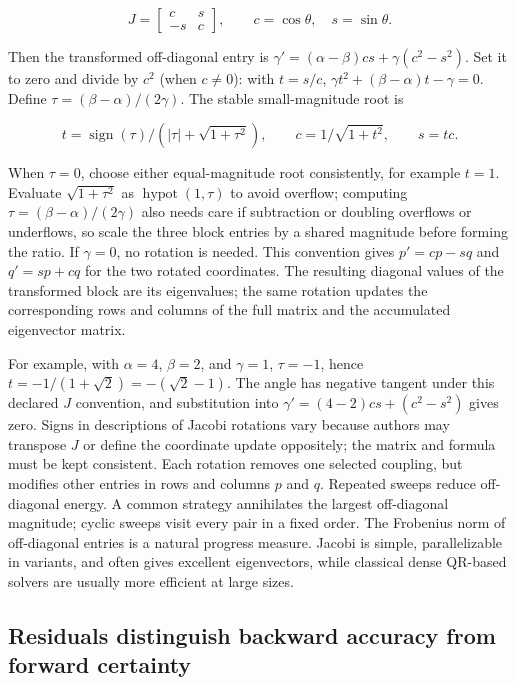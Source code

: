 \[
J=\begin{bmatrix}c&s\\-s&c\end{bmatrix},\qquad c=\cos\theta,\quad s=\sin\theta.
\]

Then the transformed off-diagonal entry is \(\gamma'=(\alpha-\beta)cs+\gamma(c^2-s^2)\). Set it to zero and divide by \(c^2\) (when \(c\ne0\)): with \(t=s/c\), \(\gamma t^2+(\beta-\alpha)t-\gamma=0\). Define \(\tau=(\beta-\alpha)/(2\gamma)\). The stable small-magnitude root is

\[
t=\operatorname{sign}(\tau)\big/(|\tau|+\sqrt{1+\tau^2}),\qquad c=1/\sqrt{1+t^2},\qquad s=tc.
\]

When \(\tau=0\), choose either equal-magnitude root consistently, for example \(t=1\). Evaluate \(\sqrt{1+\tau^2}\) as \(\operatorname{hypot}(1,\tau)\) to avoid overflow; computing \(\tau=(\beta-\alpha)/(2\gamma)\) also needs care if subtraction or doubling overflows or underflows, so scale the three block entries by a shared magnitude before forming the ratio. If \(\gamma=0\), no rotation is needed. This convention gives \(p'=cp-sq\) and \(q'=sp+cq\) for the two rotated coordinates. The resulting diagonal values of the transformed block are its eigenvalues; the same rotation updates the corresponding rows and columns of the full matrix and the accumulated eigenvector matrix.

For example, with \(\alpha=4\), \(\beta=2\), and \(\gamma=1\), \(\tau=-1\), hence \(t=-1/(1+\sqrt2)=-(\sqrt2-1)\). The angle has negative tangent under this declared \(J\) convention, and substitution into \(\gamma'=(4-2)cs+(c^2-s^2)\) gives zero. Signs in descriptions of Jacobi rotations vary because authors may transpose \(J\) or define the coordinate update oppositely; the matrix and formula must be kept consistent. Each rotation removes one selected coupling, but modifies other entries in rows and columns \(p\) and \(q\). Repeated sweeps reduce off-diagonal energy. A common strategy annihilates the largest off-diagonal magnitude; cyclic sweeps visit every pair in a fixed order. The Frobenius norm of off-diagonal entries is a natural progress measure. Jacobi is simple, parallelizable in variants, and often gives excellent eigenvectors, while classical dense QR-based solvers are usually more efficient at large sizes.

\subsection{Residuals distinguish backward accuracy from forward certainty}\label{01-foundations-i-ch020-residuals-distinguish-backward-accuracy-from-forward-certainty}

